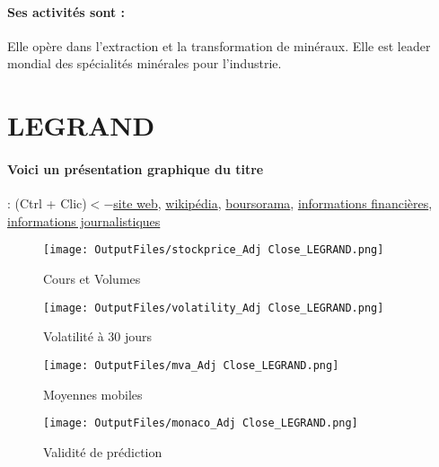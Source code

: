 \documentclass[11pt,a4paper]{report}%
\begin{document}
\paragraph{Ses activités sont : } Elle opère dans l'extraction et la transformation de minéraux. Elle est leader mondial des spécialités minérales pour l'industrie. 
    
    \newpage

\section{LEGRAND}

\paragraph{Voici un présentation graphique du titre} : (Ctrl + Clic)$<-$\href{https://www.legrandgroup.com/fr/investisseurs-et-actionnaires}{site web}, \href{https://fr.wikipedia.org/wiki/Legrand_(entreprise)}{wikipédia}, \href{https://www.boursorama.com/cours/1rPLR}{boursorama}, \href{https://www.qwant.com/?q=site:https:%2f%2fwww.easybourse.com%2faction-societe%2fLEGRAND&t=web&client=ext-firefox-hp}{informations financières}, \href{https://bourse.lerevenu.com/cours-de-bourse/fiche-valeur-synthese/LEGRAND/LR-FR}{informations journalistiques}
\begin{figure}[!htb]
   \begin{minipage}{0.5\textwidth}
     \centering
     \texttt{[image: OutputFiles/stockprice\_Adj Close\_LEGRAND.png]}
     \caption{Cours et Volumes}\label{Fig:price_LEGRAND}
   \end{minipage}\hfill
   \begin{minipage}{0.5\textwidth}
     \centering
     \texttt{[image: OutputFiles/volatility\_Adj Close\_LEGRAND.png]}
     \caption{Volatilité à 30 jours}\label{Fig:volat_LEGRAND}
   \end{minipage}
\end{figure}
\begin{figure}[!htb]
   \begin{minipage}{0.5\textwidth}
     \centering
     \texttt{[image: OutputFiles/mva\_Adj Close\_LEGRAND.png]}
     \caption{Moyennes mobiles}\label{Fig:mva_LEGRAND}
   \end{minipage}\hfill
   \begin{minipage}{0.5\textwidth}
     \centering
     \texttt{[image: OutputFiles/monaco\_Adj Close\_LEGRAND.png]}
     \caption{Validité de prédiction}\label{Fig:prediction_LEGRAND}
   \end{minipage}
\end{figure}
\end{document}
